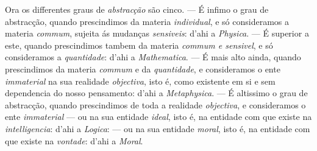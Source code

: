 Ora os differentes graus de \emph{abstracção} são cinco. --- É infimo o grau de abstracção, quando prescindimos da materia \emph{individual}, e só consideramos a materia \emph{commum}, sujeita ás mudanças \emph{sensiveis}: d'ahi a \emph{Physica}. --- É superior a este, quando prescindimos tambem da materia \emph{commum e sensivel}, e só consideramos a \emph{quantidade}: d'ahi a \emph{Mathematica}. --- É mais alto ainda, quando prescindimos da materia \emph{commum} e da \emph{quantidade}, e consideramos o ente \emph{immaterial} na sua realidade \emph{objectiva}, isto é, como existente em si e sem dependencia do nosso pensamento: d'ahi a \emph{Metaphysica}. --- É altissimo o grau de abstracção, quando prescindimos de toda a realidade \emph{objectiva}, e consideramos o ente \emph{immaterial} --- ou na sua entidade \emph{ideal}, isto é, na entidade com que existe na \emph{intelligencia}: d'ahi a \emph{Logica}: --- ou na sua entidade \emph{moral}, isto é, na entidade com que existe na \emph{vontade}: d'ahi a \emph{Moral}.

